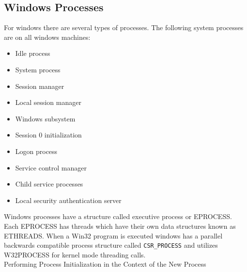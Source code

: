 \documentclass[onecolumn, draftclsnofoot,10pt, compsoc]{IEEEtran}
\begin{document}
\subsection{Windows Processes}
For windows there are several types of processes. The following system processes are on all windows machines\cite{2}:
\begin{itemize}
	\item Idle process
	\item System process 
	\item Session manager  
	\item Local session manager 
	\item Windows subsystem  
	\item Session 0 initialization 
	\item Logon process 
	\item Service control manager 
	\item Child service processes 
	\item Local security authentication server 
\end{itemize}
Windows processes have a structure called executive process or EPROCESS. Each EPROCESS has threads which have their own data structures known as ETHREADS. When a Win32 program is executed windows has a parallel backwards compatible process structure called \texttt{CSR\_PROCESS} and utilizes W32PROCESS for kernel mode threading calls. \\
Performing Process Initialization in the Context of the
New Process
\end{document}
